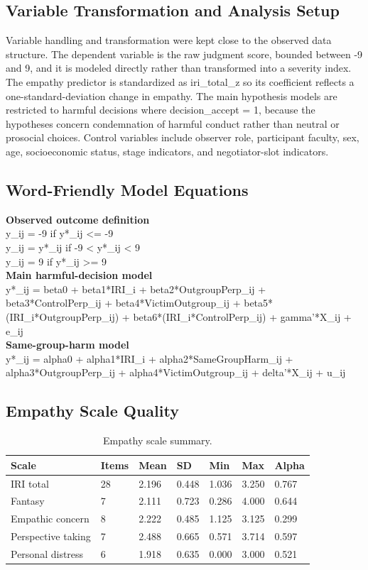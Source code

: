 \documentclass[11pt]{article}
\begin{document}
\subsection{Variable Transformation and Analysis Setup}
Variable handling and transformation were kept close to the observed data structure. The dependent variable is the raw judgment score, bounded between -9 and 9, and it is modeled directly rather than transformed into a severity index. The empathy predictor is standardized as iri\_total\_z so its coefficient reflects a one-standard-deviation change in empathy. The main hypothesis models are restricted to harmful decisions where decision\_accept = 1, because the hypotheses concern condemnation of harmful conduct rather than neutral or prosocial choices. Control variables include observer role, participant faculty, sex, age, socioeconomic status, stage indicators, and negotiator-slot indicators.
\subsection{Word-Friendly Model Equations}
\begin{flushleft}
\textbf{Observed outcome definition}\\
y\_ij = -9 if y*\_ij <= -9\\
y\_ij = y*\_ij if -9 < y*\_ij < 9\\
y\_ij = 9 if y*\_ij >= 9\\[0.4em]
\textbf{Main harmful-decision model}\\
y*\_ij = beta0 + beta1*IRI\_i + beta2*OutgroupPerp\_ij + beta3*ControlPerp\_ij + beta4*VictimOutgroup\_ij + beta5*(IRI\_i*OutgroupPerp\_ij) + beta6*(IRI\_i*ControlPerp\_ij) + gamma'*X\_ij + e\_ij\\[0.4em]
\textbf{Same-group-harm model}\\
y*\_ij = alpha0 + alpha1*IRI\_i + alpha2*SameGroupHarm\_ij + alpha3*OutgroupPerp\_ij + alpha4*VictimOutgroup\_ij + delta'*X\_ij + u\_ij
\end{flushleft}
\subsection{Empathy Scale Quality}
\begin{table}[H]
\centering
\caption{Empathy scale summary.}
\label{tab:empathy_summary}
\begin{tabular}{lllllll}
\toprule
Scale & Items & Mean & SD & Min & Max & Alpha \\
\midrule
IRI total & 28 & 2.196 & 0.448 & 1.036 & 3.250 & 0.767 \\
Fantasy & 7 & 2.111 & 0.723 & 0.286 & 4.000 & 0.644 \\
Empathic concern & 8 & 2.222 & 0.485 & 1.125 & 3.125 & 0.299 \\
Perspective taking & 7 & 2.488 & 0.665 & 0.571 & 3.714 & 0.597 \\
Personal distress & 6 & 1.918 & 0.635 & 0.000 & 3.000 & 0.521 \\
\bottomrule
\end{tabular}
\end{table}
\end{document}
